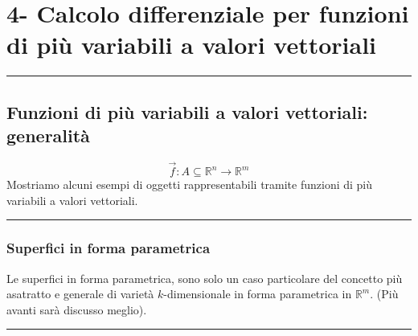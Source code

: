\section*{4- Calcolo differenziale per funzioni di più variabili a valori vettoriali}
\rule{\textwidth}{2pt}
\subsection*{Funzioni di più variabili a valori vettoriali: generalità}
\[
    \vec{f}: A\subseteq \mathbb{R}^n \rightarrow  \mathbb{R}^m
\]
Mostriamo alcuni esempi di oggetti rappresentabili tramite funzioni di più variabili a valori vettoriali.\newline
\rule{\textwidth}{0,4pt}
\subsubsection*{Superfici in forma parametrica}
Le superfici in forma parametrica, sono solo un caso particolare del concetto più asatratto e generale di varietà $k$-dimensionale in forma parametrica in $\mathbb{R}^m$. (Più avanti sarà discusso meglio).\newline
\rule{\textwidth}{0,4pt}
